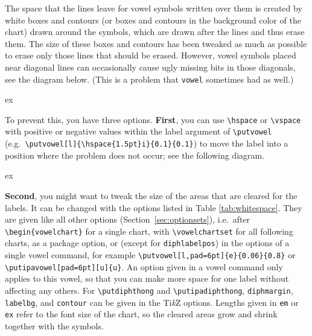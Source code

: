 \documentclass[a4paper,11pt]{article}
\newcommand\cmd[1]{\texttt{\textbackslash #1}}
\newcommand\opt[1]{\texttt{#1}}
\newcommand\pkg[1]{\texttt{#1}}
\begin{document}
The space that the lines leave for vowel symbols written over them is created by white boxes and contours (or boxes and contours in the background color of the chart) drawn around the symbols, which are drawn after the lines and thus erase them.
The size of these boxes and contours has been tweaked as much as possible to erase only those lines that should be erased.
However, vowel symbols placed near diagonal lines can occasionally cause ugly missing bits in those diagonals, see the diagram below.
(This is a problem that \pkg{vowel} sometimes had as well.)

\begin{tcblisting}{ex}
\begin{vowelchart}[slanted] %
\end{vowelchart}
\end{tcblisting}

\noindent
To prevent this, you have three options. \textbf{First}, you can use \cmd{hspace} or \cmd{vspace} with positive or negative values within the label argument of \cmd{putvowel}  (e.g.\ \verb|\putvowel[l]{\hspace{1.5pt}i}{0.1}{0.1}|) to move the label into a position where the problem does not occur; see the following diagram.

\begin{tcblisting}{ex}
  \begin{vowelchart}[slanted] %
\end{vowelchart}
\end{tcblisting}

\noindent
\enlargethispage{1\baselineskip}%
\textbf{Second}, you might want to tweak the size of the areas that are cleared for the labels. It can be changed with the options listed in Table \ref{tab:whitespace}. They are given like all other options (Section~\ref{sec:optionsets}), i.e.\ after \verb|\begin{vowelchart}| for a single chart, with \cmd{vowelchartset} for all following charts, as a package option, or (except for \opt{diphlabelpos}) in the options of a single vowel command, for example \verb|\putvowel[l,pad=6pt]{e}{0.06}{0.8}| or \verb|\putipavowel[pad=6pt][u]{u}|. An option given in a vowel command only applies to this vowel, so that you can make more space for one label without affecting any others. For \cmd{putdiphthong} and \cmd{putipadiphthong}, \opt{diphmargin}, \opt{labelbg}, and \opt{contour} can be given in the Ti\textit{k}Z options.
Lengths given in \texttt{em} or \texttt{ex} refer to the font size of the chart, so the cleared areas grow and shrink together with the symbols.
\end{document}
